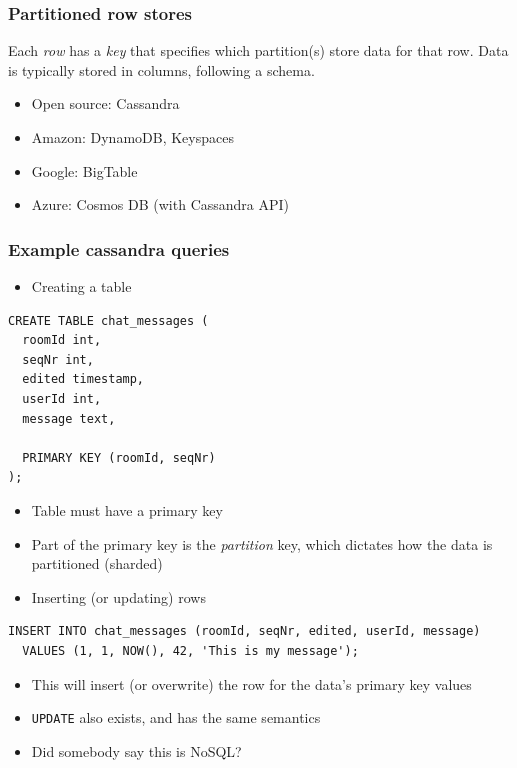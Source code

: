 \documentclass[8pt]{article}
\begin{document}
\subsubsection{Partitioned row stores}
\label{sec:org4469f05}
Each \emph{row} has a \emph{key} that specifies which partition(s) store data for that row. Data is typically stored in columns, following a schema.

\begin{itemize}
\item Open source: Cassandra
\item Amazon: DynamoDB, Keyspaces
\item Google: BigTable
\item Azure: Cosmos DB (with Cassandra API)
\end{itemize}
\subsubsection{Example cassandra queries}
\label{sec:orgdbc2c85}
\begin{itemize}
\item Creating a table
\end{itemize}
\begin{verbatim}
CREATE TABLE chat_messages (
  roomId int,
  seqNr int,
  edited timestamp,
  userId int,
  message text,

  PRIMARY KEY (roomId, seqNr)
);
\end{verbatim}
\begin{itemize}
\item Table must have a primary key
\item Part of the primary key is the \emph{partition} key, which dictates how the data is partitioned (sharded)
\end{itemize}
\begin{itemize}
\item Inserting (or updating) rows
\end{itemize}
\begin{verbatim}
INSERT INTO chat_messages (roomId, seqNr, edited, userId, message)
  VALUES (1, 1, NOW(), 42, 'This is my message');
\end{verbatim}
\begin{itemize}
\item This will insert (or overwrite) the row for the data's primary key values
\item \texttt{UPDATE} also exists, and has the same semantics
\end{itemize}
\begin{itemize}
\item Did somebody say this is NoSQL?
\end{itemize}
\end{document}
